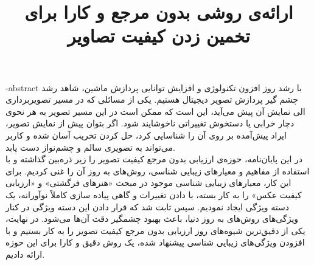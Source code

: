 \title{ارائه‌ی روشی بدون مرجع و کارا برای تخمین زدن کیفیت تصاویر}
\fa-abstract{\noindent
با رشد روز افزون تکنولوژی و افزایش توانایی پردازش ماشین، شاهد رشد چشم گیر پردازش تصویر دیجیتال هستیم. یکی از مسائلی که در مسیر تصویربرداری الی نمایش آن پیش می‌آید، این است که ممکن است در این مسیر تصویر به هر نحوی دچار خرابی یا دستخوش تغییراتی ناخوشایند شود. اگر بتوان پیش از نمایش تصویر، ایراد پیش‌آمده بر روی آن را شناسایی کرد، حل کردن تخریب آسان شده و کاربر می‌تواند به تصویری سالم و چشم‌نواز دست یابد.\\
در این پایان‌نامه، حوزه‌ی ارزیابی بدون مرجع کیفیت تصویر را زیر ذره‌بین گذاشته و با استفاده از مفاهیم و معیارهای زیبایی شناسی، روش‌های به روز آن را غنی کردیم. برای این کار، معیارهای زیبایی شناسی موجود در مبحث «هنرهای فرگشتی» و «ارزیابی کیفیت عکس» را به کار بسته، با دادن تغییرات و گاهی پیاده سازی کاملاً نوآورانه، یک دسته ویژگی ایجاد نمودیم. سپس ثابت شد که قرار دادن این دسته ویژگی در کنار ویژگی‌های روش‌های به روز دنیا، باعث بهبود چشمگیر دقت آن‌ها می‌شود. در نهایت، یکی از دقیق‌ترین شیوه‌های روز ارزیابی بدون مرجع کیفیت تصویر را به کار بستیم و با افزودن ویژگی‌های زیبایی شناسی پیشنهاد شده، یک روش دقیق و کارا برای این حوزه ارائه دادیم. 
}




\newpage
\thispagestyle{empty}
\vtitle


